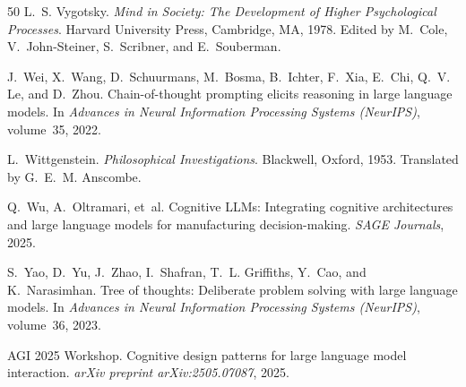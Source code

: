 \documentclass[12pt,a4paper]{article}
\begin{document}
\begin{thebibliography}{50}
L.~S. Vygotsky.
\newblock \emph{Mind in Society: The Development of Higher Psychological Processes}.
\newblock Harvard University Press, Cambridge, MA, 1978.
\newblock Edited by M.~Cole, V.~John-Steiner, S.~Scribner, and E.~Souberman.

J.~Wei, X.~Wang, D.~Schuurmans, M.~Bosma, B.~Ichter, F.~Xia, E.~Chi, Q.~V. Le, and D.~Zhou.
\newblock Chain-of-thought prompting elicits reasoning in large language models.
\newblock In \emph{Advances in Neural Information Processing Systems (NeurIPS)}, volume~35, 2022.

L.~Wittgenstein.
\newblock \emph{Philosophical Investigations}.
\newblock Blackwell, Oxford, 1953.
\newblock Translated by G.~E.~M. Anscombe.

Q.~Wu, A.~Oltramari, et~al.
\newblock Cognitive LLMs: Integrating cognitive architectures and large language models for manufacturing decision-making.
\newblock \emph{SAGE Journals}, 2025.

S.~Yao, D.~Yu, J.~Zhao, I.~Shafran, T.~L. Griffiths, Y.~Cao, and K.~Narasimhan.
\newblock Tree of thoughts: Deliberate problem solving with large language models.
\newblock In \emph{Advances in Neural Information Processing Systems (NeurIPS)}, volume~36, 2023.

AGI 2025 Workshop.
\newblock Cognitive design patterns for large language model interaction.
\newblock \emph{arXiv preprint arXiv:2505.07087}, 2025.

\end{thebibliography}
\end{document}
